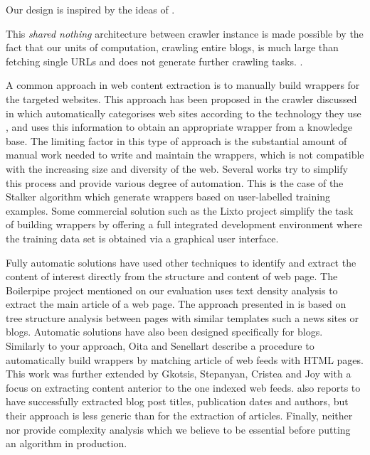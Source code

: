 Our design is inspired by the ideas of .

This \emph{shared nothing} architecture between crawler instance is made possible by the fact that our units of computation, crawling entire blogs, is much large than fetching single URLs and does not generate further crawling tasks. .


A common approach in web content extraction is to manually build wrappers for the targeted websites. This approach has been proposed in the crawler discussed in \cite{faheem2012intelligent} which automatically categorises web sites according to the technology they use , and uses this information to obtain an appropriate wrapper from a knowledge base. The limiting factor in this type of approach is the substantial amount of manual work needed to write and maintain the wrappers, which is not compatible with the increasing size and diversity of the web. Several works try to simplify this process and provide various degree of automation. This is the case of the Stalker algorithm \cite{stalker} which generate wrappers based on user-labelled training examples. Some commercial solution such as the Lixto project \cite{lixto} simplify the task of building wrappers by offering a full integrated development environment where the training data set is obtained via a graphical user interface.

Fully automatic solutions have used other techniques to identify and extract the content of interest directly from the structure and content of web page. The Boilerpipe project \cite{kohlschuetter2010} mentioned on our evaluation uses text density analysis to extract the main article of a web page. The approach presented in \cite{treeedit} is based on tree structure analysis between pages with similar templates such a news sites or blogs. Automatic solutions have also been designed specifically for blogs. Similarly to your approach, Oita and Senellart \cite{oita2010} describe a procedure to automatically build wrappers by matching article of web feeds with HTML pages. This work was further extended by Gkotsis, Stepanyan, Cristea and Joy \cite{gkotsis2013} with a focus on extracting content anterior to the one indexed web feeds. \cite{gkotsis2013} also reports to have successfully extracted blog post titles, publication dates and authors, but their approach is less generic than for the extraction of articles. Finally, neither \cite{oita2010} nor \cite{gkotsis2013} provide complexity analysis which we believe to be essential before putting an algorithm in production.

